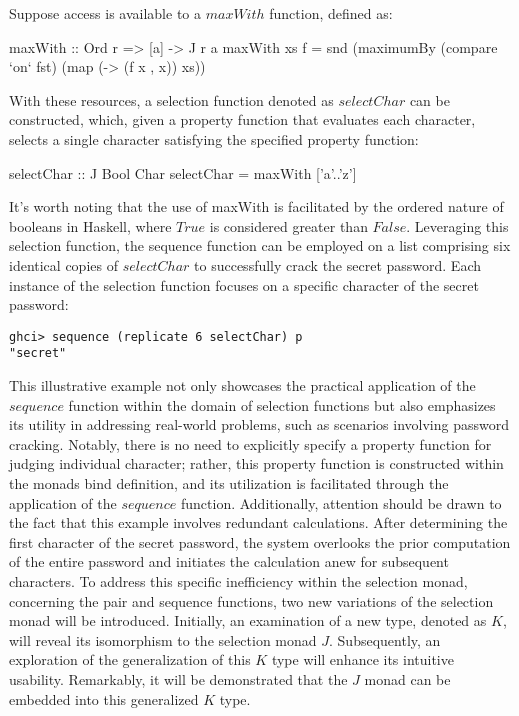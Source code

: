 \documentclass[runningheads]{llncs}
\begin{document}
Suppose access is available to a \(maxWith\) function, defined as:

\begin{code}
maxWith :: Ord r => [a] -> J r a
maxWith xs f = snd (maximumBy (compare `on` fst) 
                              (map (\x -> (f x , x)) xs))
\end{code}

With these resources, a selection function denoted as \(selectChar\) can
be constructed, which, given a property function that evaluates each
character, selects a single character satisfying the specified property
function:

\begin{code}
selectChar :: J Bool Char
selectChar = maxWith ['a'..'z']
\end{code}

It's worth noting that the use of maxWith is facilitated by the ordered
nature of booleans in Haskell, where \(True\) is considered greater than
\(False\). Leveraging this selection function, the sequence function can
be employed on a list comprising six identical copies of \(selectChar\)
to successfully crack the secret password. Each instance of the
selection function focuses on a specific character of the secret
password:

\begin{verbatim}
ghci> sequence (replicate 6 selectChar) p
"secret"
\end{verbatim}

This illustrative example not only showcases the practical application
of the \(sequence\) function within the domain of selection functions
but also emphasizes its utility in addressing real-world problems, such
as scenarios involving password cracking. Notably, there is no need to
explicitly specify a property function for judging individual character;
rather, this property function is constructed within the monads bind
definition, and its utilization is facilitated through the application
of the \(sequence\) function. Additionally, attention should be drawn to
the fact that this example involves redundant calculations. After
determining the first character of the secret password, the system
overlooks the prior computation of the entire password and initiates the
calculation anew for subsequent characters. To address this specific
inefficiency within the selection monad, concerning the pair and
sequence functions, two new variations of the selection monad will be
introduced. Initially, an examination of a new type, denoted as \(K\),
will reveal its isomorphism to the selection monad \(J\). Subsequently,
an exploration of the generalization of this \(K\) type will enhance its
intuitive usability. Remarkably, it will be demonstrated that the \(J\)
monad can be embedded into this generalized \(K\) type.
\end{document}
